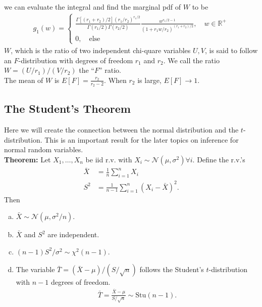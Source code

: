 \documentclass{book}
\theoremstyle{definition}
\newcommand{\R}{\mathbb{R}}
\newcommand{\Else}{\text{else}}
\newcommand{\N}{\mathcal{N}}
\newcommand{\f}[2]{\frac{#1}{#2}}
\begin{document}
we can evaluate the integral and find the marginal pdf of $W$ to be 
\begin{align}
g_1(w) = \begin{cases}
\f{\Gamma[(r_1+r_2)/2](r_1/r_2)^{r_1/2}}{\Gamma(r_1/2)\Gamma(r_2/2)}\f{w^{r_1/2-1}}{(1+r_1w/r_2)^{(r_1+r_2)/2}}, \quad w\in \R^+\\
0, \quad \Else
\end{cases}
\end{align}
$W$, which is the ratio of two independent chi-quare variables $U,V$, is said to follow an $F$-distribution with degrees of freedom $r_1$ and $r_2$. We call the ratio $W = (U/r_1)/(V/r_2)$ the ``$F$'' ratio. \\

The mean of $W$ is $E[F] = \f{r_2}{r_2-2}$. When $r_2$ is large, $E[F] \to 1$.  


\subsection{The Student's Theorem}

Here we will create the connection between the normal distribution and the $t$-distribution. This is an important result for the later topics on inference for normal random variables. \\

\noindent\textbf{Theorem:} Let $X_1, \dots, X_n$ be iid r.v. with $X_i \sim \N(\mu,\sigma^2) \forall i$. Define the r.v.'s
\begin{align}
\bar{X} &= \f{1}{n}\sum^n_{i=1}X_i\\
S^2 &= \f{1}{n-1}\sum^n_{i=1}(X_i - \bar{X})^2.
\end{align}
Then
\begin{enumerate}[(a)]
	\item $\bar{X} \sim \N(\mu, \sigma^2/n)$.
	\item $\bar{X}$ and $S^2$ are independent. 
	\item $(n-1)S^2/\sigma^2 \sim \chi^2(n-1)$.
	\item The variable $\bar{T} = (\bar{X} - \mu)/(S/\sqrt{n})$ follows the Student's $t$-distribution with $n-1$ degrees of freedom. 
	\begin{align}
	\bar{T} = \f{\bar{X} - \mu}{S/\sqrt{n}} \sim \text{Stu}(n-1).
	\end{align}
\end{enumerate}
\end{document}
